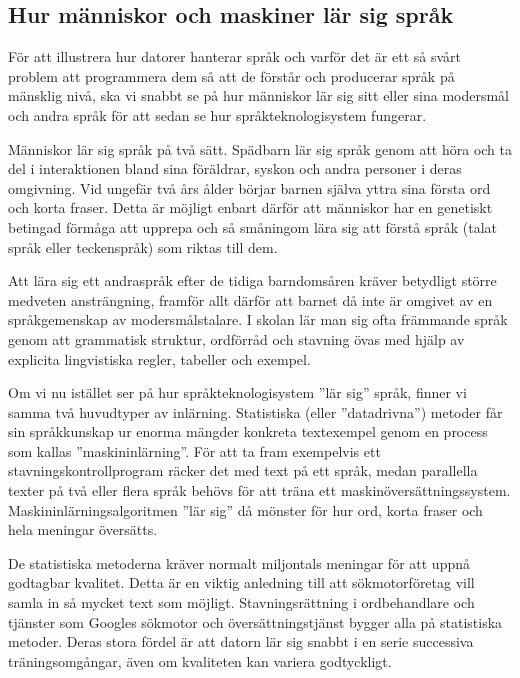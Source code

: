 \begin{multicols}{2}
\subsection{Hur människor och maskiner lär sig språk}

För att illustrera hur datorer hanterar språk och varför det är ett så
svårt problem att programmera dem så att de förstår och producerar
språk på mänsklig nivå, ska vi snabbt se på hur människor lär sig sitt
eller sina modersmål och andra språk för att sedan se hur
språkteknologisystem fungerar.


Människor lär sig språk på två sätt. Spädbarn lär sig språk genom att
höra och ta del i interaktionen bland sina föräldrar, syskon och andra
personer i deras omgivning. Vid ungefär två års ålder börjar barnen
själva yttra sina första ord och korta fraser. Detta är möjligt enbart
därför att människor har en genetiskt betingad förmåga att upprepa och
så småningom lära sig att förstå språk (talat språk eller teckenspråk)
som riktas till dem.

Att lära sig ett andraspråk efter de tidiga barn\-doms\-åren kräver
betydligt större medveten ansträngning, framför allt därför att barnet
då inte är omgivet av en språkgemenskap av modersmålstalare. I skolan
lär man sig ofta främmande språk genom att grammatisk struktur,
ordförråd och stavning övas med hjälp av explicita lingvistiska
regler, tabeller och exempel.

Om vi nu istället ser på hur språkteknologisystem ''lär sig'' språk,
finner vi samma två huvudtyper av inlärning. Statistiska (eller
''datadrivna'') metoder får sin språkkunskap ur enorma mängder
konkreta textexempel genom en process som kallas
''maskin\-in\-lär\-ning''. För att ta fram exempelvis ett
stavningskontrollprogram räcker det med text på ett språk, medan
parallella texter på två eller flera språk behövs för att träna ett
maskinöversättningssystem. Maskininlärningsalgoritmen ''lär sig'' då
mönster för hur ord, korta fraser och hela meningar översätts.

De statistiska metoderna kräver normalt miljontals meningar för att
uppnå godtagbar kvalitet. Detta är en viktig anledning till att
sökmotorföretag vill samla in så mycket text som
möjligt. Stavningsrättning i ordbehandlare och tjänster som Googles
sökmotor och översättningstjänst bygger alla på statistiska
metoder. Deras stora fördel är att datorn lär sig snabbt i en
serie successiva träningsomgångar, även om kvaliteten kan variera
godtyckligt.


\end{multicols}
